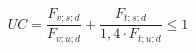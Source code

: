 \documentclass[12pt]{article}
\begin{document}
\begin{displaymath}
UC = \frac {F_{v;s;d}} {F_{v;u;d}} + \frac {F_{t;s;d}} {1,4 \cdot F_{t;u;d}} \leq 1
\end{displaymath}
\end{document}

